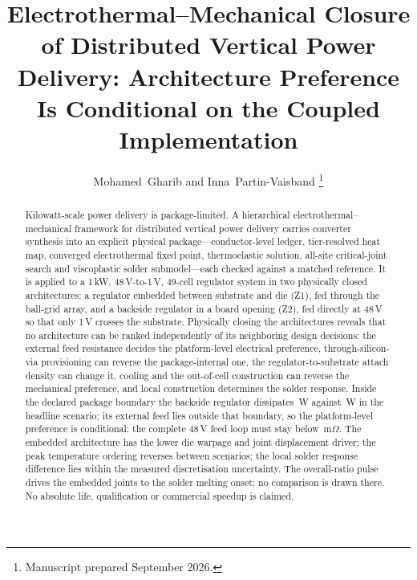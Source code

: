 \documentclass[journal]{IEEEtran}
\begin{document}
\title{Electrothermal--Mechanical Closure of Distributed Vertical Power Delivery: Architecture Preference Is Conditional on the Coupled Implementation}

\author{Mohamed~Gharib and Inna~Partin-Vaisband%
\thanks{Manuscript prepared September 2026.}}

\maketitle

\begin{abstract}
Kilowatt-scale power delivery is package-limited. A hierarchical
electrothermal--mechanical framework for distributed vertical power delivery carries converter
synthesis into an explicit physical package---conductor-level ledger, tier-resolved heat map,
converged electrothermal fixed point, thermoelastic solution, all-site critical-joint search and
viscoplastic solder submodel---each checked against a matched reference. It is applied to a 1\,kW, 48\,V-to-1\,V, 49-cell
regulator system in two physically closed architectures: a regulator embedded between
substrate and die (Z1), fed through the ball-grid array, and a backside regulator in a board
opening (Z2), fed directly at 48\,V so that only 1\,V crosses the substrate. Physically closing the architectures reveals that no architecture can be ranked independently of its neighboring design decisions: the external feed resistance decides the platform-level electrical preference, through-silicon-via provisioning can reverse the package-internal one, the regulator-to-substrate attach density can change it, cooling and the out-of-cell construction can reverse the mechanical preference, and local construction determines the solder response.
Inside the declared package boundary the backside regulator dissipates \PlossZtwo\,W against \PlossZone\,W in the headline scenario; its external feed lies outside that boundary, so the platform-level preference is conditional: the complete 48\,V feed loop must stay below \RstarSzero\,m$\Omega$. The embedded architecture has the lower die warpage and joint displacement driver; the peak temperature ordering reverses between scenarios; the local solder response difference lies within the measured discretisation uncertainty.
The overall-ratio pulse drives the embedded joints to the solder melting onset; no comparison is drawn there. No absolute life, qualification or commercial speedup is claimed.
\end{abstract}
\end{document}
